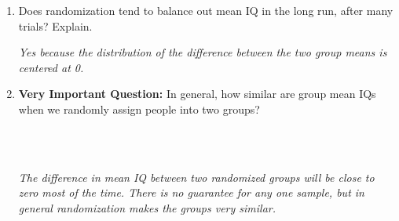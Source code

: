 \begin{enumerate}
\begin{key}
  {\it  Not exactly in every single trial though on average (over many
    shuffles) the groups are   equivalent.  }
\end{key}
  
\item  Does randomization tend to balance out mean IQ in the long
  run, after many trials? Explain. 
\begin{students}
 \vspace{3cm} 
\end{students}

\begin{key}
  {\it  Yes because the distribution of the difference between the two
   group means is centered at 0. }
\end{key}


  
\item {\bf Very Important Question:}  In general, how similar are
  group mean IQs when we randomly assign people into two groups?
\begin{students}
        \vspace{4cm}\\
\end{students}
\begin{key}
  \\ {\it  The difference in mean IQ between two randomized groups
    will be close to zero most of the time.  There is no guarantee for
  any one sample, but in general randomization makes the groups very
  similar.} 
\end{key}



\end{enumerate}
